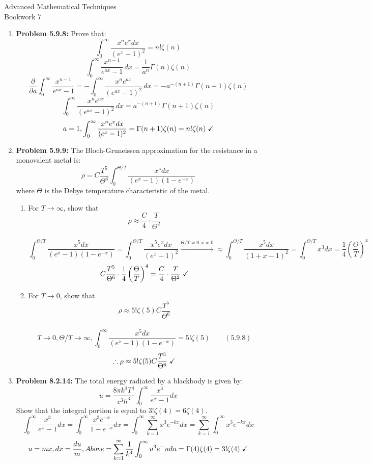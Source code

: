 \documentclass{article}
\begin{document}
\thispagestyle{fancy}
\begin{center}\LARGE{Advanced Mathematical Techniques \\ Bookwork 7}\end{center}
\vspace{10mm}
\begin{enumerate}
    \item \textbf{Problem 5.9.8:} Prove that: \[\int_{0}^{\infty}\frac{x^ne^xdx}{(e^x-1)^2}=n!\zeta(n)\]
    \[\int_0^\infty \frac{x^{n-1}}{e^{ax} - 1} \, dx = \frac{1}{a^n} \Gamma(n) \zeta(n)\]
    \[ \frac{\partial}{\partial a} \int_0^\infty \frac{x^{n-1}}{e^{ax} - 1} = -\int_0^\infty \frac{x^n e^{ax}}{(e^{ax} - 1)^2} \, dx = -a^{-(n+1)} \Gamma(n+1) \zeta(n)\]
    \[\int_0^\infty \frac{x^n e^{ax}}{(e^{ax} - 1)^2} \, dx = a^{-(n+1)} \Gamma(n+1) \zeta(n)\]
    \[a = 1, \int_{0}^{\infty} \frac{x^ne^xdx}{(e^x-1)^2} = \Gamma(n+1)\zeta(n) = n!\zeta(n) \hspace{1mm} \checkmark\]
    \item \textbf{Problem 5.9.9:} The Bloch-Gruneissen approximation for the resistance in a monovalent metal is:
    \[\rho = C\frac{T^5}{\Theta^6}\int_{0}^{\Theta/T}\frac{x^5dx}{(e^x-1)(1-e^{-x})}\]
    where $\Theta$ is the Debye temperature characteristic of the metal.
    \begin{enumerate}
        \item For $T \to \infty$, show that
        \[\rho \approx \frac C 4 \cdot \frac T {\Theta^2}\]
        \\
        \[\int_{0}^{\Theta/T}\frac{x^5dx}{(e^x-1)(1-e^{-x})} = \int_{0}^{\Theta/T}\frac{x^5e^xdx}{(e^x-1)^2} \xrightarrow{\Theta/T \approx 0, x \approx 0} \approx \int_{0}^{\Theta/T}\frac{x^5dx}{(1+x-1)^2} = \int_{0}^{\Theta/T} x^3dx = \frac 1 4\left(\frac{\Theta}{T}\right)^4\]
        \[C\frac{T^5}{\Theta^6} \cdot \frac 1 4 \left( \frac{\Theta}{T}\right)^4 = \frac{C}{4} \cdot \frac{T}{\Theta^2} \hspace{1mm} \checkmark \]
        \item For $T \to 0$, show that 
        \[\rho \approx 5!\zeta(5)C\frac{T^5}{\Theta^6}\]
        \\
        \[T\to 0, \Theta/T \to \infty, \int_{0}^{\infty}\frac{x^5dx}{(e^x-1)(1-e^{-x})} = 5!\zeta(5)\qquad (5.9.8)\]
        \[\therefore \rho \approx 5!\zeta(5)C\frac{T^5}{\Theta^6} \hspace{1mm} \checkmark\]
    \end{enumerate}
    \item \textbf{Problem 8.2.14:} The total energy radiated by a blackbody is given by:
    \[u = \frac{8\pi k^4T^4}{c^3h^3}\int_{0}^{\infty}\frac{x^3}{e^x-1}dx\]
    Show that the integral portion is equal to $3!\zeta(4) = 6\zeta(4)$.
    \\
    \[\int_{0}^{\infty} \frac{x^3}{e^x-1}dx = \int_{0}^{\infty}\frac{x^3e^{-x}}{1-e^{-x}}dx = \int_{0}^{\infty}\sum_{k=1}^{\infty} x^3e^{-kx}dx = \sum_{k=1}^{\infty} \int_{0}^{\infty}x^3e^{-kx}dx\]
    \[u = mx, dx = \frac{du}{m}, Above = \sum_{k=1}^{\infty} \frac{1}{k^4}\int_{0}^{\infty} u^3e^-udu = \Gamma(4)\zeta(4) = 3!\zeta(4) \hspace{1mm} \checkmark\]
\end{enumerate}
\end{document}
